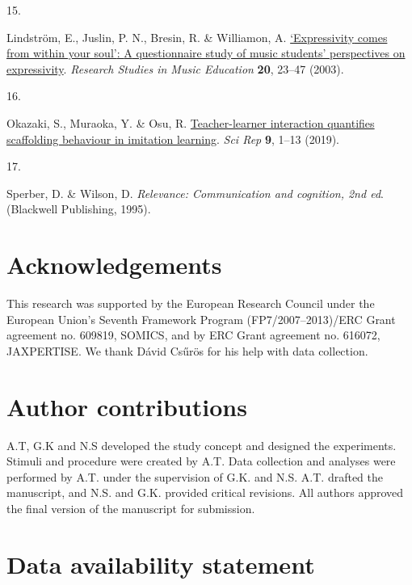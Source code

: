 \documentclass[
  man,floatsintext]{apa6}
\newlength{\cslhangindent}
\newlength{\csllabelwidth}
\newlength{\cslentryspacingunit} %
\newenvironment{CSLReferences}[2] %
 {%
  \setlength{\parindent}{0pt}
  \ifodd #1
  \let\oldpar\par
  \def\par{\hangindent=\cslhangindent\oldpar}
  \fi
  \setlength{\parskip}{#2\cslentryspacingunit}
 }%
 {}
\newcommand{\CSLLeftMargin}[1]{\parbox[t]{\csllabelwidth}{#1}}
\newcommand{\CSLRightInline}[1]{\parbox[t]{\linewidth - \csllabelwidth}{#1}\break}
\begin{document}
\begin{CSLReferences}{0}{0}
\leavevmode{}%
\CSLLeftMargin{15. }%
\CSLRightInline{Lindström, E., Juslin, P. N., Bresin, R. \& Williamon, A. \href{https://doi.org/10.1177/1321103X030200010201}{{`{Expressivity} comes from within your soul'}: {A} questionnaire study of music students' perspectives on expressivity}. \emph{Research Studies in Music Education} \textbf{20}, 23--47 (2003).}

\leavevmode{}%
\CSLLeftMargin{16. }%
\CSLRightInline{Okazaki, S., Muraoka, Y. \& Osu, R. \href{https://doi.org/10.1038/s41598-019-44049-x}{Teacher-learner interaction quantifies scaffolding behaviour in imitation learning}. \emph{Sci Rep} \textbf{9}, 1--13 (2019).}

\leavevmode{}%
\CSLLeftMargin{17. }%
\CSLRightInline{Sperber, D. \& Wilson, D. \emph{Relevance: {Communication} and cognition, 2nd ed}. ({Blackwell Publishing}, 1995).}

\end{CSLReferences}

\endgroup

\hypertarget{acknowledgements}{%
\section{Acknowledgements}\label{acknowledgements}}

This research was supported by the European Research Council under the European Union's Seventh Framework Program (FP7/2007--2013)/ERC Grant agreement no. 609819, SOMICS, and by ERC Grant agreement no. 616072, JAXPERTISE. We thank Dávid Csűrös for his help with data collection.

\hypertarget{author-contributions}{%
\section{Author contributions}\label{author-contributions}}

A.T, G.K and N.S developed the study concept and designed the experiments. Stimuli and procedure were created by A.T. Data collection and analyses were performed by A.T. under the supervision of G.K. and N.S. A.T. drafted the manuscript, and N.S. and G.K. provided critical revisions. All authors approved the final version of the manuscript for submission.

\hypertarget{data-availability-statement}{%
\section{Data availability statement}\label{data-availability-statement}}
\end{document}
